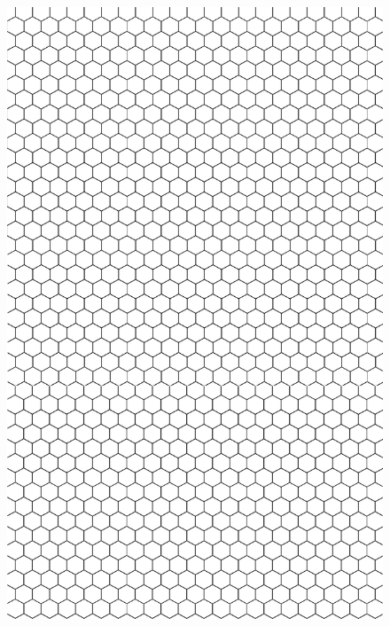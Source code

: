 \documentclass[10pt]{article}
\begin{document}
\newpage
\begin{figure}[h]

  \centering
  
  \includegraphics[width=0.8\linewidth]{hex.png}
  
  \label{fig:mpr}
  
  \end{figure}
\end{document}
